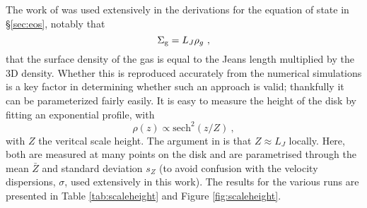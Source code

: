 The work of \citet{schaye_model-independent_2001} was used extensively in the derivations for the equation of state in \S \ref{sec:eos}, notably that
$$
    \Sigma_\mathrm{g} = L_J \rho_g~,
$$
that the surface density of the gas is equal to the Jeans length multiplied by the 3D density.
Whether this is reproduced accurately from the numerical simulations is a key factor in determining whether such an approach is valid; thankfully it can be parameterized fairly easily.
It is easy to measure the height of the disk by fitting an exponential profile, with
$$
    \rho(z) \propto \mathrm{sech}^2\left(z/Z\right)~,
$$
with $Z$ the veritcal scale height.
The argument in \citet{schaye_model-independent_2001} is that $Z \approx L_J$ locally.
Here, both are measured at many points on the disk and are parametrised through the mean $\bar{Z}$ and standard deviation $s_Z$ (to avoid confusion with the velocity dispersions, $\sigma$, used extensively in this work).
The results for the various runs are presented in Table \ref{tab:scaleheight} and Figure \ref{fig:scaleheight}.
